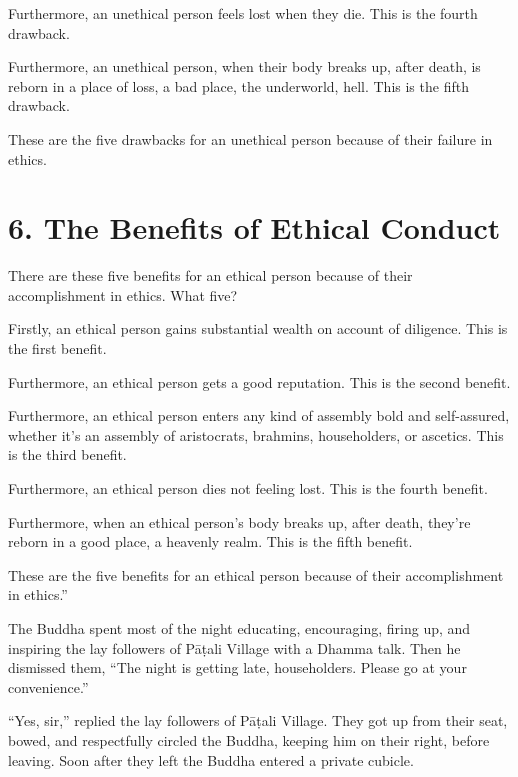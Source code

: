 \documentclass[12pt,openany]{book}%
\begin{document}
Furthermore, an unethical person feels lost when they die. This is the fourth drawback. 

Furthermore, an unethical person, when their body breaks up, after death, is reborn in a place of loss, a bad place, the underworld, hell. This is the fifth drawback. 

These are the five drawbacks for an unethical person because of their failure in ethics. 

\section*{6. The Benefits of Ethical Conduct }

There are these five benefits for an ethical person because of their accomplishment in ethics. What five? 

Firstly, an ethical person gains substantial wealth on account of diligence. This is the first benefit. 

Furthermore, an ethical person gets a good reputation. This is the second benefit. 

Furthermore, an ethical person enters any kind of assembly bold and self-assured, whether it’s an assembly of aristocrats, brahmins, householders, or ascetics. This is the third benefit. 

Furthermore, an ethical person dies not feeling lost. This is the fourth benefit. 

Furthermore, when an ethical person’s body breaks up, after death, they’re reborn in a good place, a heavenly realm. This is the fifth benefit. 

These are the five benefits for an ethical person because of their accomplishment in ethics.” 

The Buddha spent most of the night educating, encouraging, firing up, and inspiring the lay followers of \textsanskrit{Pāṭali} Village with a Dhamma talk. Then he dismissed them, “The night is getting late, householders. Please go at your convenience.” 

“Yes, sir,” replied the lay followers of \textsanskrit{Pāṭali} Village. They got up from their seat, bowed, and respectfully circled the Buddha, keeping him on their right, before leaving. Soon after they left the Buddha entered a private cubicle. 
\end{document}
